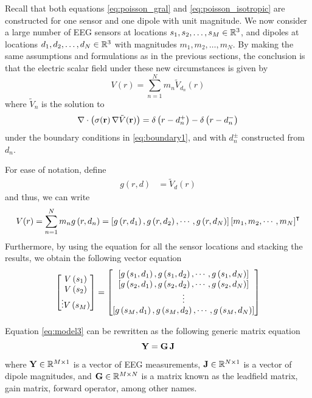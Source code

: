 Recall that both equations \eqref{eq:poisson_gral} and \eqref{eq:poisson_isotropic} are constructed for one sensor and one dipole with unit magnitude.
%
We now consider a large number of EEG sensors at locations $s_1, s_2, \dots, s_M \in \mathbb{R}^3$, and dipoles at locations $d_1, d_2, \dots, d_N \in \mathbb{R}^3$
with magnitudes $m_1, m_2, \dots, m_N$.
%
By making the same assumptions and formulations as in the previous sections, the conclusion is that the electric scalar field under these new circumstances is given by
\begin{equation}
V(r) = 
\sum_{n=1}^N m_n \tilde{V}_{d_n}(r)
\end{equation}
where $\tilde{V}_n$ is the solution to 
\begin{equation}
\nabla \cdot\left( \sigma(\mathbf{r})\, \nabla \tilde{V}(\mathbf{r})  \right) = 
{\delta\left( r-d_n^+ \right) - \delta\left( r-d_n^- \right)}
\end{equation}
under the boundary conditions in \eqref{eq:boundary1}, and with $d_n^\pm$ constructed from $d_n$.

For ease of notation, define 
\begin{align}
g(r, d) &= \tilde{V}_d(r)
\end{align}
and thus, we can write
\begin{equation}
V(r) = 
\sum_{n=1}^N m_n g\left( r, d_n \right) = 
\left[ g\left( r, d_1 \right), g\left( r, d_2 \right), \cdots, g\left( r, d_N \right) \right]
\left[ m_1, m_2, \cdots, m_N \right]^\intercal
\label{eq:back1}
\end{equation}
Furthermore, by using the equation for all the sensor locations and stacking the results, we obtain the following vector equation
\begin{equation}
\begin{bmatrix}
V\left( s_1 \right) \\
V\left( s_2 \right) \\
\vdots
V\left( s_M \right)
\end{bmatrix}
=
\begin{bmatrix}
\left[ g\left( s_1, d_1 \right), g\left( s_1, d_2 \right), \cdots, g\left( s_1, d_N \right) \right] \\
\left[ g\left( s_2, d_1 \right), g\left( s_2, d_2 \right), \cdots, g\left( s_2, d_N \right) \right] \\
\vdots \\
\left[ g\left( s_M, d_1 \right), g\left( s_M, d_2 \right), \cdots, g\left( s_M, d_N \right) \right]
\end{bmatrix}
\label{eq:model3}
\end{equation}

Equation \eqref{eq:model3} can be rewritten as the following generic matrix equation
\begin{equation}
\mathbf{Y} = \mathbf{G}\, \mathbf{J}
\label{eq:model4}
\end{equation}
where $\mathbf{Y} \in \mathbb{R}^{M\times 1}$ is a vector of EEG measurements, $\mathbf{J} \in \mathbb{R}^{N\times 1}$ is a vector of dipole magnitudes, and $\mathbf{G} \in \mathbb{R}^{M\times N}$ is a matrix known as the leadfield matrix, gain matrix, forward operator, among other names.

